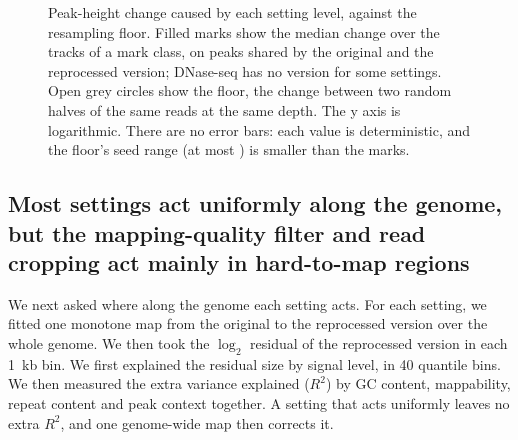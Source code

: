 \documentclass[pdflatex,sn-mathphys-num]{sn-jnl}
\newcommand{\lit}[1]{#1}
\begin{document}
\begin{figure}[t]
\centering
{}
\caption{Peak-height change caused by each setting level, against the resampling floor. Filled
marks show the median change over the tracks of a mark class, on peaks shared by the original
and the reprocessed version; DNase-seq has no version for some settings. Open grey circles
show the floor, the change between two random halves of the same reads at the same depth. The
y axis is logarithmic. There are no error bars: each value is deterministic, and the floor's
seed range (at most \phFloorSpreadHi{}) is smaller than the marks.}\label{fig:peak}
\end{figure}

\subsection{Most settings act uniformly along the genome, but the mapping-quality filter and read cropping act mainly in hard-to-map regions}\label{sec:r2}

We next asked where along the genome each setting acts. For each setting, we fitted one
monotone map from the original to the reprocessed version over the whole genome. We then took
the $\log_{\lit{2}}$ residual of the reprocessed version in each \lit{1}~kb bin. We first
explained the residual size by signal level, in \lit{40} quantile bins. We then measured the
extra variance explained ($R^{\lit{2}}$) by GC content, mappability, repeat content and peak
context together. A setting that acts uniformly leaves no extra $R^{\lit{2}}$, and one genome-wide
map then corrects it.
\end{document}
